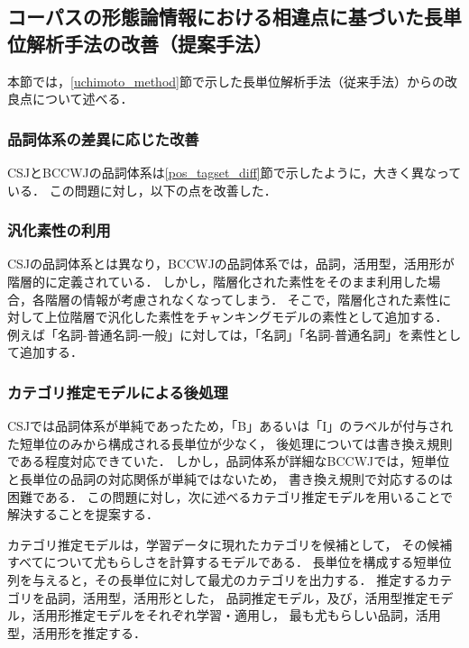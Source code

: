 \documentclass[japanese]{jnlp_1.4}
\begin{document}
\subsection{コーパスの形態論情報における相違点に基づいた長単位解析手法の改善（提案手法）}
\label{apply_corpus_diff}

本節では，\ref{uchimoto_method}節で示した長単位解析手法（従来手法）からの改良点について述べる．

\subsubsection{品詞体系の差異に応じた改善}
\label{apply_pos_tagset}

CSJとBCCWJの品詞体系は\ref{pos_tagset_diff}節で示したように，大きく異なっている．
この問題に対し，以下の点を改善した．

\subsubsection*{汎化素性の利用}

CSJの品詞体系とは異なり，BCCWJの品詞体系では，品詞，活用型，活用形が階層的に定義されている．
しかし，階層化された素性をそのまま利用した場合，各階層の情報が考慮されなくなってしまう．
そこで，階層化された素性に対して上位階層で汎化した素性をチャンキングモデルの素性として追加する．
例えば「名詞-普通名詞-一般」に対しては，「名詞」「名詞-普通名詞」を素性として追加する．


\subsubsection*{カテゴリ推定モデルによる後処理}

CSJでは品詞体系が単純であったため，「B」あるいは「I」のラベルが付与された短単位のみから構成される長単位が少なく，
後処理については書き換え規則である程度対応できていた．
しかし，品詞体系が詳細なBCCWJでは，短単位と長単位の品詞の対応関係が単純ではないため，
書き換え規則で対応するのは困難である．
この問題に対し，次に述べるカテゴリ推定モデルを用いることで解決することを提案する．

カテゴリ推定モデルは，学習データに現れたカテゴリを候補として，
その候補すべてについて尤もらしさを計算するモデルである．
長単位を構成する短単位列を与えると，その長単位に対して最尤のカテゴリを出力する．
推定するカテゴリを品詞，活用型，活用形とした，
品詞推定モデル，及び，活用型推定モデル，活用形推定モデルをそれぞれ学習・適用し，
最も尤もらしい品詞，活用型，活用形を推定する．
\end{document}
